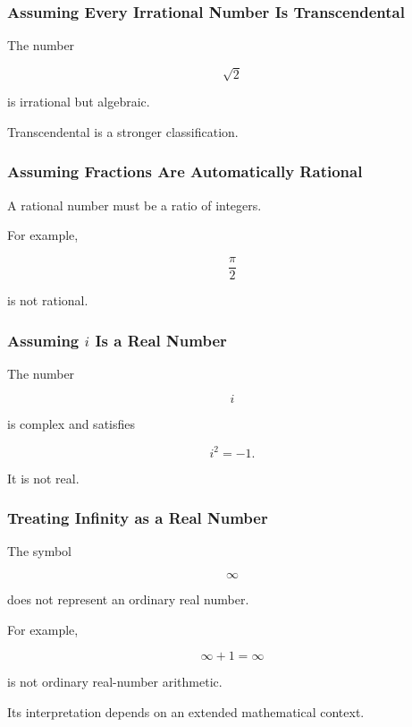 \subsubsection{Assuming Every Irrational Number Is Transcendental}

The number

\[
\boxed{
\sqrt2
}
\]

is irrational but algebraic.

Transcendental is a stronger classification.

\subsubsection{Assuming Fractions Are Automatically Rational}

A rational number must be a ratio of integers.

For example,

\[
\boxed{
\frac{\pi}{2}
}
\]

is not rational.

\subsubsection{Assuming \(i\) Is a Real Number}

The number

\[
\boxed{
i
}
\]

is complex and satisfies

\[
i^2=-1.
\]

It is not real.

\subsubsection{Treating Infinity as a Real Number}

The symbol

\[
\boxed{
\infty
}
\]

does not represent an ordinary real number.

For example,

\[
\boxed{
\infty+1=\infty
}
\]

is not ordinary real-number arithmetic.

Its interpretation depends on an extended mathematical context.

